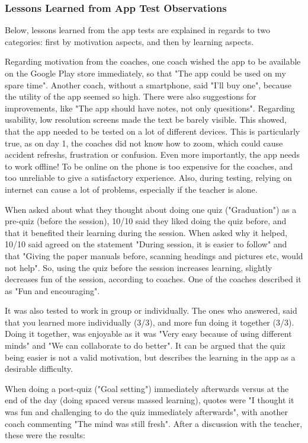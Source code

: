     \subsubsection{Lessons Learned from App Test Observations}

    Below, lessons learned from the app tests are explained in regards to two categories: first by motivation aspects, and then by learning aspects.

    Regarding motivation from the coaches, one coach wished the app to be available on the Google Play store immediately, so that "The app could be used on my spare time". Another coach, without a smartphone, said "I'll buy one", because the utility of the app seemed so high. There were also suggestions for improvements, like "The app should have notes, not only quesitions". Regarding usability, low resolution screens made the text be barely visible. This showed, that the app needed to be tested on a lot of different devices. This is particularly true, as on day 1, the coaches did not know how to zoom, which could cause accident refreshs, frustration or confusion. Even more importantly, the app needs to work offline! To be online on the phone is too expensive for the coaches, and too unreliable to give a satisfactory experience. Also, during testing, relying on internet can cause a lot of problems, especially if the teacher is alone.

    When asked about what they thought about doing one quiz ("Graduation") as a pre-quiz (before the session), 10/10 said they liked doing the quiz before, and that it benefited their learning during the session. When asked why it helped, 10/10 said agreed on the statement "During session, it is easier to follow" and that "Giving the paper manuals before, scanning headings and pictures etc, would not help". So, using the quiz before the session increases learning, slightly decreases fun of the session, according to coaches. One of the coaches described it as "Fun and encouraging".

    It was also tested to work in group or individually. The ones who answered, said that you learned more individually (3/3), and more fun doing it together (3/3). Doing it together, was enjoyable as it was "Very easy because of using different minds" and "We can collaborate to do better". It can be argued that the quiz being easier is not a valid motivation, but describes the learning in the app as a desirable difficulty.

    When doing a post-quiz ("Goal setting") immediately afterwards versus at the end of the day (doing spaced versus massed learning), quotes were "I thought it was fun and challenging to do the quiz immediately afterwards", with another coach commenting "The mind was still fresh". After a discussion with the teacher, these were the results:

